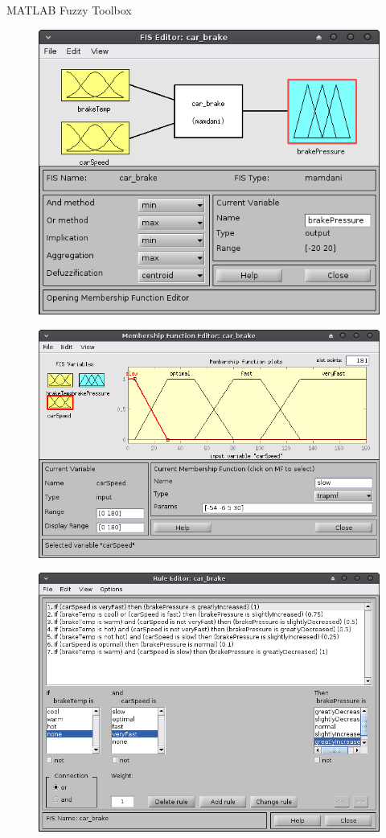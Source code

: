 \documentclass[hyperref={unicode}]{beamer}
\begin{document}
\begin{frame}[allowframebreaks]{MATLAB Fuzzy Toolbox}
	\begin{figure}
	\includegraphics[width=.75\textwidth]{sw-1}
	\end{figure}
	\begin{figure}
	\includegraphics[width=.75\textwidth]{sw-2}
	\end{figure}
	\begin{figure}
	\includegraphics[width=.75\textwidth]{sw-4}

\end{figure}
\end{frame}
\end{document}
